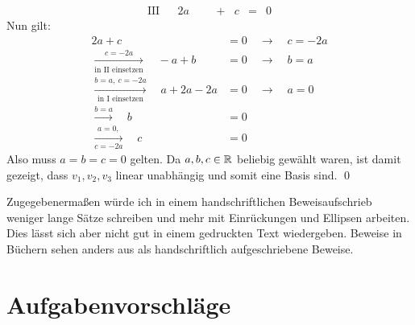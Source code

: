 \begin{de}
\begin{bew}
\[\begin{array}{rcccccccc}
            \text{III} &&  2a && &+ &c & =& 0
        \end{array}\]
        Nun gilt:
        \begin{align*}
            2a+c&=0 \quad \to\quad c = -2a \\
            \xrightarrow[\text{in II einsetzen}]{c=-2a}\quad -a+b &=0 \quad\to\quad b=a \\[0.5em]
            \xrightarrow[\text{in I einsetzen}]{b=a,\ c=-2a} \quad a+2a-2a &= 0 \quad\to\quad a= 0 \\
            \xrightarrow{b=a}\quad b &= 0 \\
            \xrightarrow[c=-2a]{a=0,} \quad c &= 0
        \end{align*}
        Also muss $a=b=c=0$ gelten. Da $a,b,c\in \mathbb R$ beliebig gewählt waren, ist damit gezeigt, dass $v_1,v_2,v_3$ linear unabhängig und somit eine Basis sind. \qed
    \end{bew}
\end{de}


Zugegebenermaßen würde ich in einem handschriftlichen Beweisaufschrieb weniger lange Sätze schreiben und mehr mit Einrückungen und Ellipsen arbeiten. Dies lässt sich aber nicht gut in einem gedruckten Text wiedergeben. Beweise in Büchern sehen anders aus als handschriftlich aufgeschriebene Beweise.





\clearpage
\section{Aufgabenvorschläge}


